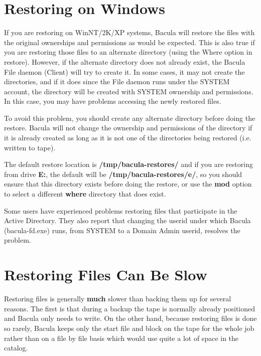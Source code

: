 \label{Windows}
\section{Restoring on Windows}

If you are restoring on WinNT/2K/XP systems, Bacula will restore the files
with the original ownerships and permissions as would be expected.  This is
also true if you are restoring those files to an alternate directory (using
the Where option in restore).  However, if the alternate directory does not
already exist, the Bacula File daemon (Client) will try to create it.  In
some cases, it may not create the directories, and if it does since the
File daemon runs under the SYSTEM account, the directory will be created
with SYSTEM ownership and permissions.  In this case, you may have problems
accessing the newly restored files.

To avoid this problem, you should create any alternate directory before
doing the restore.  Bacula will not change the ownership and permissions of
the directory if it is already created as long as it is not one of the
directories being restored (i.e.  written to tape).

The default restore location is {\bf /tmp/bacula-restores/} and if you are
restoring from drive {\bf E:}, the default will be 
{\bf /tmp/bacula-restores/e/}, so you should ensure that this directory
exists before doing the restore, or use the {\bf mod} option to
select a different {\bf where} directory that does exist.

Some users have experienced problems restoring files that participate in
the Active Directory. They also report that changing the userid under which
Bacula (bacula-fd.exe) runs, from SYSTEM to a Domain Admin userid, resolves
the problem.


\section{Restoring Files Can Be Slow}

Restoring files is generally {\bf much} slower than backing them up for several
reasons. The first is that during a backup the tape is normally already
positioned and Bacula only needs to write. On the other hand, because restoring
files is done so rarely, Bacula keeps only the start file and block on the
tape for the whole job rather than on a file by file basis which would use
quite a lot of space in the catalog. 

